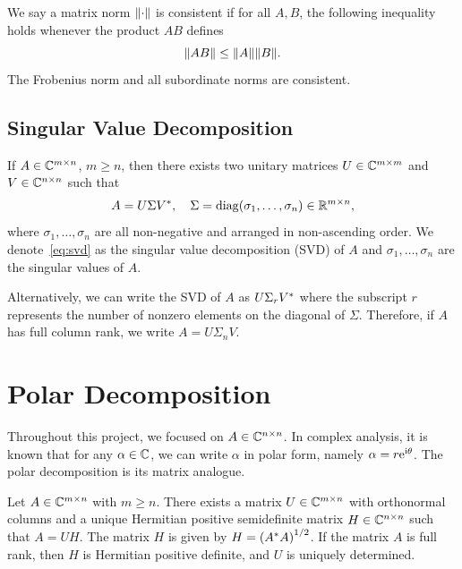 \documentclass[12pt]{article}
\begin{document}
We say a matrix norm $\|{\cdot}\|$ is consistent if for all $A,B$, the following inequality holds whenever the product $AB$ defines 
\begin{equation}
    \notag 
    \|{AB}\| \leq \|{A}\|\|{B}\|.
\end{equation}
The Frobenius norm and all subordinate norms are consistent.

\subsection{Singular Value Decomposition}\label{subsec:svd}
\begin{theorem}
    \label{thm:svd}
    If $A\in\mathbb{C}^{m\times n}$, $m\geq n$, then there exists two unitary matrices $U\in\mathbb{C}^{m\times m}$ and $V\in\mathbb{C}^{n\times n}$ such that 
    \begin{equation}\label{eq:svd}
        A = U\Sigma V^*,\quad \Sigma = \mathrm{diag}(\sigma_1,\dots,\sigma_n)\in\mathbb{R}^{m\times n},
    \end{equation}
    where $\sigma_1,\dots,\sigma_n$ are all non-negative and arranged in non-ascending order. We denote~\eqref{eq:svd} as the singular value decomposition (SVD) of $A$ and $\sigma_1,\dots,\sigma_n$ are the singular values of $A$.
\end{theorem}

Alternatively, we can write the SVD of $A$ as $U\Sigma_rV^*$ where the subscript $r$ represents the number of nonzero elements on the diagonal of $\Sigma$. Therefore, if $A$ has full column rank, we write $A = U\Sigma_n V$. 




\section{Polar Decomposition}\label{sec:polar-properties}

Throughout this project, we focused on $A\in\mathbb{C}^{n\times n}$. In complex analysis, it is known that for any $\alpha\in\mathbb{C}$, we can write $\alpha$ in polar form, namely $\alpha = r\mathrm{e}^{\mathrm{i} \theta}$. The polar decomposition is its matrix analogue.

\begin{theorem}
     \label{def:pol-dec-definition}
    Let $A\in\mathbb{C}^{m\times n}$ with $m \geq n$. There exists a matrix $U\in\mathbb{C}^{m\times n}$ with orthonormal columns and a unique Hermitian positive semidefinite matrix $H\in\mathbb{C}^{n\times n}$ such that $A = UH$. The matrix $H$ is given by $H = \left(A^* A\right)^{1/2}$. If the matrix $A$ is full rank, then $H$ is Hermitian positive definite, and $U$ is uniquely determined.
\end{theorem}
\end{document}
